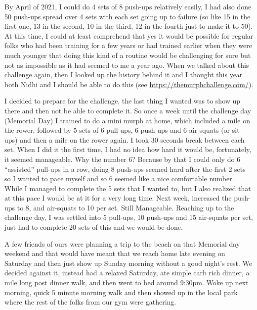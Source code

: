 \documentclass[
  oneside]{book}
\begin{document}
By April of 2021, I could do 4 sets of 8 push-ups relatively easily, I had also done 50 push-ups spread over 4 sets with each set going up to failure (so like 15 in the first one, 13 in the second, 10 in the third, 12 in the fourth just to make it to 50). At this time, I could at least comprehend that yes it would be possible for regular folks who had been training for a few years or had trained earlier when they were much younger that doing this kind of a routine would be challenging for sure but not as impossible as it had seemed to me a year ago. When we talked about this challenge again, then I looked up the history behind it and I thought this year both Nidhi and I should be able to do this (see \url{https://themurphchallenge.com/}).

I decided to prepare for the challenge, the last thing I wanted was to show up there and then not be able to complete it. So once a week until the challenge day (Memorial Day) I trained to do a mini murph at home, which included a mile on the rower, followed by 5 sets of 6 pull-ups, 6 push-ups and 6 air-squats (or sit-ups) and then a mile on the rower again. I took 30 seconds break between each set. When I did it the first time, I had no idea how hard it would be, fortunately, it seemed manageable. Why the number 6? Because by that I could only do 6 ``assisted'' pull-ups in a row, doing 8 push-ups seemed hard after the first 2 sets so I wanted to pace myself and so 6 seemed like a nice comfortable number. While I managed to complete the 5 sets that I wanted to, but I also realized that at this pace I would be at it for a very long time. Next week, increased the push-ups to 8, and air-squats to 10 per set. Still Manageable. Reaching up to the challenge day, I was settled into 5 pull-ups, 10 push-ups and 15 air-squats per set, just had to complete 20 sets of this and we would be done.

A few friends of ours were planning a trip to the beach on that Memorial day weekend and that would have meant that we reach home late evening on Saturday and then just show up Sunday morning without a good night's rest. We decided against it, instead had a relaxed Saturday, ate simple carb rich dinner, a mile long post dinner walk, and then went to bed around 9:30pm. Woke up next morning, quick 5 minute morning walk and then showed up in the local park where the rest of the folks from our gym were gathering.
\end{document}
